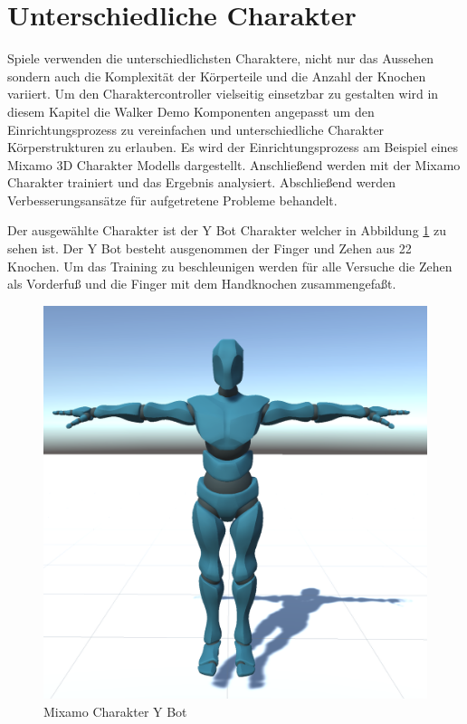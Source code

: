 \section{Unterschiedliche Charakter}
Spiele verwenden die unterschiedlichsten Charaktere, nicht nur das Aussehen sondern auch die Komplexität der Körperteile und die Anzahl der Knochen variiert. Um den Charaktercontroller vielseitig einsetzbar zu gestalten wird in diesem Kapitel die Walker Demo Komponenten angepasst um den Einrichtungsprozess zu vereinfachen und unterschiedliche Charakter Körperstrukturen zu erlauben. Es wird der Einrichtungsprozess am Beispiel eines Mixamo 3D Charakter Modells dargestellt. Anschließend werden mit der Mixamo Charakter trainiert und das Ergebnis analysiert. Abschließend werden Verbesserungsansätze für aufgetretene Probleme behandelt.

Der ausgewählte Charakter ist der Y Bot Charakter welcher in Abbildung \ref{fig:y_bot} zu sehen ist. Der Y Bot besteht ausgenommen der Finger und Zehen aus 22 Knochen. Um das Training zu beschleunigen werden für alle Versuche die Zehen als Vorderfuß und die Finger mit dem Handknochen zusammengefaßt.

\begin{figure}[H]
  \centering  
  \includegraphics[scale=0.5]{img/y_bot.png}
  \caption{Mixamo Charakter Y Bot}
  \label{fig:y_bot}
\end{figure}

